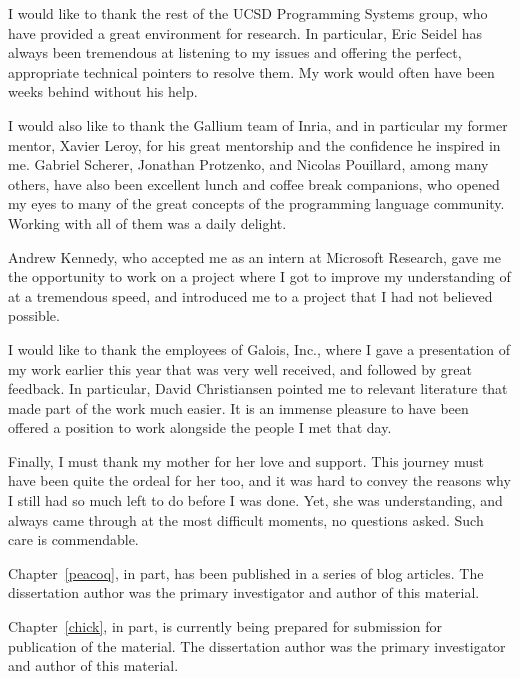 \documentclass[12pt]{ucsddissertation}
\begin{document}
\begin{acknowledgements}
I would like to thank the rest of the UCSD Programming Systems group, who have
provided a great environment for research.  In particular, Eric Seidel has
always been tremendous at listening to my issues and offering the perfect,
appropriate technical pointers to resolve them.  My work would often have been
weeks behind without his help.

I would also like to thank the Gallium team of Inria, and in particular my
former mentor, Xavier Leroy, for his great mentorship and the confidence he
inspired in me.  Gabriel Scherer, Jonathan Protzenko, and Nicolas Pouillard,
among many others, have also been excellent lunch and coffee break companions,
who opened my eyes to many of the great concepts of the programming language
community.  Working with all of them was a daily delight.

Andrew Kennedy, who accepted me as an intern at Microsoft Research, gave me the
opportunity to work on a project where I got to improve my understanding of
\Coq{} at a tremendous speed, and introduced me to a project that I had not
believed possible.

I would like to thank the employees of Galois, Inc., where I gave a presentation
of my work earlier this year that was very well received, and followed by great
feedback.  In particular, David Christiansen pointed me to relevant literature
that made part of the work much easier.  It is an immense pleasure to have been
offered a position to work alongside the people I met that day.

Finally, I must thank my mother for her love and support.  This journey must
have been quite the ordeal for her too, and it was hard to convey the reasons
why I still had so much left to do before I was done.  Yet, she was
understanding, and always came through at the most difficult moments, no
questions asked.  Such care is commendable.

Chapter~\ref{peacoq}, in part, has been published in a series of blog
articles. The dissertation author was the primary investigator and author of
this material.

Chapter~\ref{chick}, in part, is currently being prepared for submission for
publication of the material.  The dissertation author was the primary
investigator and author of this material.



\end{acknowledgements}
\end{document}
